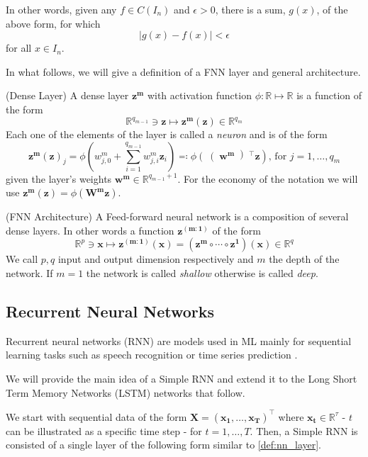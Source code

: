 \documentclass[a4paper, oneside]{discothesis}
\begin{document}
In other words, given any $f\in C(I_n)$ and $\epsilon >0$, there is a sum, $g(x)$, of the above form, for which
\begin{equation}
|g(x)-f(x)|<\epsilon
\end{equation}
for all $x\in I_n$.

In what follows, we will give a definition of a FNN layer and general architecture.

 (Dense Layer) \label{def:nn_layer}A dense layer $\bm{z^m}$ with activation function $\phi:\mathbb{R}\mapsto\mathbb{R}$ is a function of the form
\begin{equation}
\mathbb{R}^{q_{m-1}}\ni \bm{z} \longmapsto \bm{z^m}(\bm{z}) \in \mathbb{R}^{q_{m}}
\end{equation}
Each one of the elements of the layer is called a \textit{neuron} and is of the form
\begin{equation}
\bm{z^m}(\bm{z})_j = \phi \left(w_{j,0}^m+\sum_{i=1}^{q_{m-1}}w_{j,i}^m\bm{z}_i\right)\eqqcolon\phi\left(\right(\bm{w^m}\left) ^\intercal\bm{z}\right)\text{, for } j = 1, \dots, q_m
\end{equation}
given the layer's weights $\bm{w^m}\in \mathbb{R}^{q_{m-1}+1}$. For the economy of the notation we will use $\bm{z^m}(\bm{z}) = \phi \left(\bm{W^m z} \right)$.

 (FNN Architecture) A Feed-forward neural network is a composition of several dense layers. In other words a function $\bm{z^{(m:1)}}$ of the form
\begin{equation}
\mathbb{R}^p\ni \bm{x} \longmapsto \bm{z^{(m:1)}}(\bm{x}) = \left(\bm{z^m}\circ\cdots\circ\bm{z^1}\right)(\bm{x})\in \mathbb{R}^q
\end{equation}
We call $p, q$ input and output dimension respectively and $m$ the depth of the network. If $m=1$ the network is called \textit{shallow} otherwise is called \textit{deep}.

\subsection{Recurrent Neural Networks}\label{RNN}
Recurrent neural networks (RNN) are models used in ML mainly for sequential learning tasks such as speech recognition \cite{speechRNN} or time series prediction \cite{Hewamalage_2021}. 

We will provide the main idea of a Simple RNN and extend it to the Long Short Term Memory Networks (LSTM) networks that follow.

We start with sequential data of the form $\bm{X} = \left(\bm{x_1}, \dots, \bm{x_T}\right)^\intercal $ where $\bm{x_t}\in\mathbb{R}^{\tau}$ - $t$ can be illustrated as a specific time step -  for $t = 1, \dots, T$. Then, a Simple RNN is consisted of a single layer of the following form similar to \ref{def:nn_layer}. 
\end{document}

